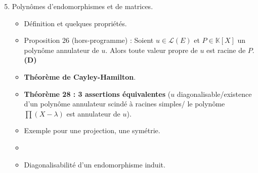 \documentclass[twoside,a4paper,french,10pt]{VcCours}
\begin{document}
\begin{enumerate}
\setcounter{enumi}{4}
\item Polynômes d'endomorphismes et de matrices.
\begin{itemize}
\item Définition et quelques propriétés.
\item Proposition 26 (hors-programme) : Soient $u \in \mathcal{L}(E)$ et $P \in \mathbb{K}[X]$ un polynôme annulateur de $u$. Alors toute valeur propre de $u$ est racine de $P$. \textbf{(D)}
\item \textbf{Théorème de Cayley-Hamilton}.
\item \textbf{Théorème 28 : 3 assertions équivalentes}
($u$ diagonalisable/existence d'un polynôme annulateur scindé à racines simples/
le polynôme $\prod(X- \lambda)$ est annulateur de $u$).
\item Exemple pour une projection, une symétrie.
\item %
\item Diagonalisabilité d'un endomorphisme induit.

\end{itemize}
\end{enumerate}
\end{document}
